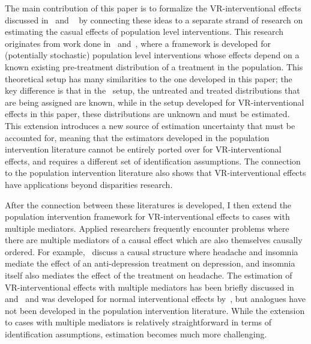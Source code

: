 \documentclass[11pt]{article} %
\numberwithin{equation}{section} %
\begin{document}
The main contribution of this paper is to formalize the VR-interventional effects discussed in~\cite{vanderweelerobinson2014} and ~\cite{jacksonvanderweele2018} by connecting these ideas to a separate strand of research on estimating the casual effects of population level interventions. This research originates from work done in~\cite{hubbardvanderlaan2008} and~\cite{diazvanderlaan2012}, where a framework is developed for (potentially stochastic) population level interventions whose effects depend on a known existing pre-treatment distribution of a treatment in the population. This theoretical setup has many similarities to the one developed in this paper; the key difference is that in the~\cite{hubbardvanderlaan2008} setup, the untreated and treated distributions that are being assigned are known, while in the setup developed for VR-interventional effects in this paper, these distributions are unknown and must be estimated. This extension introduces a new source of estimation uncertainty that must be accounted for, meaning that the estimators developed in the population intervention literature cannot be entirely ported over for VR-interventional effects, and requires a different set of identification assumptions. The connection to the population intervention literature also shows that VR-interventional effects have applications beyond disparities research. 

After the connection between these literatures is developed, I then extend the population intervention framework for VR-interventional effects to cases with multiple mediators. Applied researchers frequently encounter problems where there are multiple mediators of a causal effect which are also themselves causally ordered. For example,~\cite{morenobetancur2018} discuss a causal structure where headache and insomnia mediate the effect of an anti-depression treatment on depression, and insomnia itself also mediates the effect of the treatment on headache. The estimation of VR-interventional effects with multiple mediators has been briefly discussed in~\cite{jacksonvanderweele2018} and~\cite{jackson2021} and was developed for normal interventional effects by~\cite{vansteelandtdaniel2017}, but analogues have not been developed in the population intervention literature. While the extension to cases with multiple mediators is relatively straightforward in terms of identification assumptions, estimation becomes much more challenging. 
\end{document}
